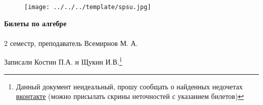 \documentclass[main]{subfiles}
\begin{document}
	\begin{figure}[H]
			\texttt{[image: ../../../template/spsu.jpg]}
			\centering
	\end{figure}
	\vspace*{\fill}
	\begin{center}
		\huge \textbf{Билеты по алгебре}\\ \ \\
		\Large 2 семестр, преподаватель Всемирнов М. А.

		\large Записали Костин П.А. и Щукин И.В.\footnote{Данный документ неидеальный, прошу сообщать о найденных недочетах \href{https://vk.com/drab_existence_a}{вконтакте} (можно присылать скрины неточностей с указанием билетов)}
	\end{center}
	\vspace*{\fill}
	\vspace*{\fill}

	\newpage
	\tableofcontents
	\newpage
\end{document}

